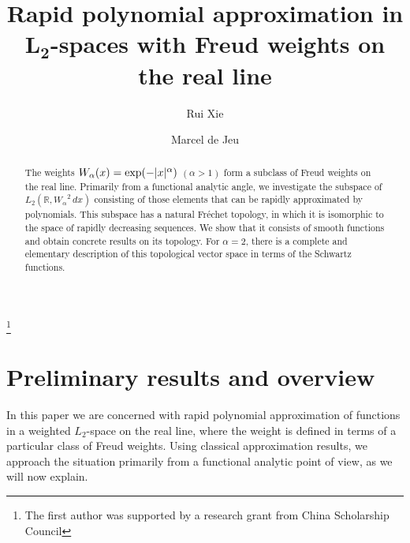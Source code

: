\documentclass[12pt, reqno]{amsart}
\numberwithin{equation}{section}
\theoremstyle{plain}
\theoremstyle{definition}
\begin{document}
\title[Rapid polynomial approximation in ${L_2}$-spaces with Freud weights]{Rapid polynomial approximation in $\boldsymbol{L_2}$-spaces with Freud weights on the real line}
\author{Rui Xie}
\address{Rui~Xie,
Department of Mathematics,
Harbin Institute of Technology
Harbin, 150001, P.R.\ China}
\thanks{The first author was supported by a research grant from China Scholarship Council}
\author{Marcel de Jeu}
\address{Marcel~de~Jeu, Mathematical Institute,
Leiden University,
P.O.\ Box 9512,
2300 RA Leiden,
The Netherlands}
\date{}

\begin{abstract}
The weights ${W_\alpha}(x)=\textup{exp}(-|x|^{\alpha})$ $(\alpha>1)$ form a subclass of Freud weights on the real line. Primarily from a functional analytic angle, we investigate the subspace of ${{L_2({{\mathbb R}}, {W_\alpha}^2\,dx)}}$ consisting of those elements that can be rapidly approximated by polynomials. This subspace has a natural Fr\'echet topology, in which it is isomorphic to the space of rapidly decreasing sequences. We show that it consists of smooth functions and obtain concrete results on its topology. For $\alpha=2$, there is a complete and elementary description of this topological vector space in terms of the Schwartz functions.
\end{abstract}
\maketitle
 \section{Preliminary results and overview}\label{sec:intro}

In this paper we are concerned with rapid polynomial approximation of functions in a weighted $L_2$-space on the real line, where the weight is defined in terms of a particular class of Freud weights. Using classical approximation results, we approach the situation primarily from a functional analytic point of view, as we will now explain.
\end{document}
